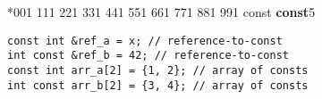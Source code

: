 \documentclass[7pt, twocolumn]{extarticle}
\begin{document}
\begin{small}
\begin{minipage}[h]{4.9cm}
\begin{tcolorbox}
{{   *{0}{{{\color{vscode_green!100!black}0}}}1
    {1}{{{\color{vscode_green!100!black}1}}}1
    {2}{{{\color{vscode_green!100!black}2}}}1
    {3}{{{\color{vscode_green!100!black}3}}}1
    {4}{{{\color{vscode_green!100!black}4}}}1
    {5}{{{\color{vscode_green!100!black}5}}}1
    {6}{{{\color{vscode_green!100!black}6}}}1
    {7}{{{\color{vscode_green!100!black}7}}}1
    {8}{{{\color{vscode_green!100!black}8}}}1
    {9}{{{\color{vscode_green!100!black}9}}}1
    {const}{{{\color{blue} \textbf{const}}}}5
}
\begin{lstlisting}[style = mystyle,numbers=none]
const int &ref_a = x; // reference-to-const
int const &ref_b = 42; // reference-to-const
const int arr_a[2] = {1, 2}; // array of consts
int const arr_b[2] = {3, 4}; // array of consts
\end{lstlisting}
}
   \end{tcolorbox} 
    \end{minipage}


\end{small}
\end{document}
